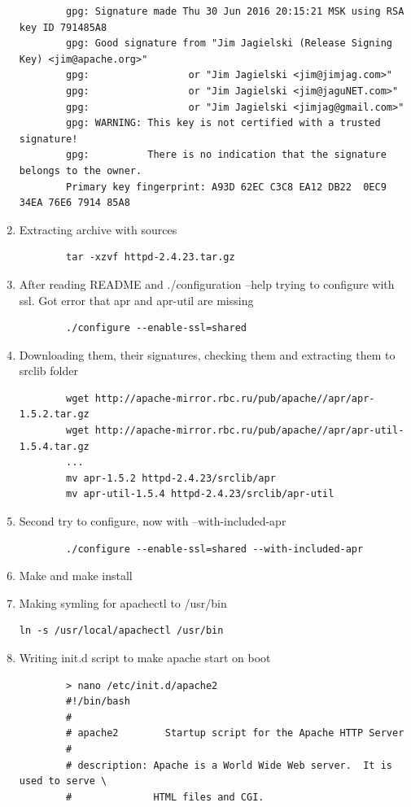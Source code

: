 \documentclass[10pt]{article}
\begin{document}
\begin{enumerate}
\begin{verbatim}
        gpg: Signature made Thu 30 Jun 2016 20:15:21 MSK using RSA key ID 791485A8
        gpg: Good signature from "Jim Jagielski (Release Signing Key) <jim@apache.org>"
        gpg:                 or "Jim Jagielski <jim@jimjag.com>"
        gpg:                 or "Jim Jagielski <jim@jaguNET.com>"
        gpg:                 or "Jim Jagielski <jimjag@gmail.com>"
        gpg: WARNING: This key is not certified with a trusted signature!
        gpg:          There is no indication that the signature belongs to the owner.
        Primary key fingerprint: A93D 62EC C3C8 EA12 DB22  0EC9 34EA 76E6 7914 85A8
    \end{verbatim}
    \item Extracting archive with sources
    \begin{verbatim}
        tar -xzvf httpd-2.4.23.tar.gz
    \end{verbatim}
    \item After reading README and ./configuration --help trying to configure with ssl. Got error that apr and apr-util are missing
    \begin{verbatim}
        ./configure --enable-ssl=shared
    \end{verbatim}
    \item Downloading them, their signatures, checking them and extracting them to srclib folder
    \begin{verbatim}
        wget http://apache-mirror.rbc.ru/pub/apache//apr/apr-1.5.2.tar.gz
        wget http://apache-mirror.rbc.ru/pub/apache//apr/apr-util-1.5.4.tar.gz
        ...
        mv apr-1.5.2 httpd-2.4.23/srclib/apr
        mv apr-util-1.5.4 httpd-2.4.23/srclib/apr-util
    \end{verbatim}
    \item Second try to configure, now with --with-included-apr
    \begin{verbatim}
        ./configure --enable-ssl=shared --with-included-apr
    \end{verbatim}
    \item Make and make install
    \item Making symling for apachectl to /usr/bin
    \begin{verbatim}ln -s /usr/local/apachectl /usr/bin \end{verbatim}
    \item Writing init.d script to make apache start on boot
    \begin{verbatim}
        > nano /etc/init.d/apache2
        #!/bin/bash
        #
        # apache2        Startup script for the Apache HTTP Server
        #
        # description: Apache is a World Wide Web server.  It is used to serve \
        #              HTML files and CGI.


\end{verbatim}
\end{enumerate}
\end{document}
